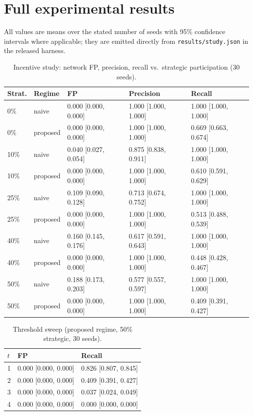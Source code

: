 \documentclass[11pt]{article}
\newcommand{\code}[1]{\texttt{\small #1}}
\begin{document}
\section{Full experimental results}\label{app:full}
All values are means over the stated number of seeds with 95\% confidence intervals where applicable; they are emitted directly from \code{results/study.json} in the released harness.
\begin{table}[h]\centering\small\caption{Incentive study: network FP, precision, recall vs.\ strategic participation (30 seeds).}\label{tab:app:inc}
\begin{tabular}{lllll}\toprule Strat. & Regime & FP & Precision & Recall\\\midrule
0\% & naive & 0.000 [0.000, 0.000] & 1.000 [1.000, 1.000] & 1.000 [1.000, 1.000]\\
0\% & proposed & 0.000 [0.000, 0.000] & 1.000 [1.000, 1.000] & 0.669 [0.663, 0.674]\\
10\% & naive & 0.040 [0.027, 0.054] & 0.875 [0.838, 0.911] & 1.000 [1.000, 1.000]\\
10\% & proposed & 0.000 [0.000, 0.000] & 1.000 [1.000, 1.000] & 0.610 [0.591, 0.629]\\
25\% & naive & 0.109 [0.090, 0.128] & 0.713 [0.674, 0.752] & 1.000 [1.000, 1.000]\\
25\% & proposed & 0.000 [0.000, 0.000] & 1.000 [1.000, 1.000] & 0.513 [0.488, 0.539]\\
40\% & naive & 0.160 [0.145, 0.176] & 0.617 [0.591, 0.643] & 1.000 [1.000, 1.000]\\
40\% & proposed & 0.000 [0.000, 0.000] & 1.000 [1.000, 1.000] & 0.448 [0.428, 0.467]\\
50\% & naive & 0.188 [0.173, 0.203] & 0.577 [0.557, 0.597] & 1.000 [1.000, 1.000]\\
50\% & proposed & 0.000 [0.000, 0.000] & 1.000 [1.000, 1.000] & 0.409 [0.391, 0.427]\\
\bottomrule\end{tabular}\end{table}
\begin{table}[h]\centering\small\caption{Threshold sweep (proposed regime, 50\% strategic, 30 seeds).}\label{tab:app:thr}
\begin{tabular}{lll}\toprule $t$ & FP & Recall\\\midrule
1 & 0.000 [0.000, 0.000] & 0.826 [0.807, 0.845]\\
2 & 0.000 [0.000, 0.000] & 0.409 [0.391, 0.427]\\
3 & 0.000 [0.000, 0.000] & 0.037 [0.024, 0.049]\\
4 & 0.000 [0.000, 0.000] & 0.000 [0.000, 0.000]\\
\bottomrule\end{tabular}\end{table}
\end{document}
